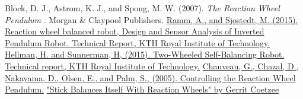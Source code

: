 \documentclass[12pt,letterpaper]{article}
\begin{document}
 
\begin{thebibliography}{99}
 Block, D. J., Astrom, K. J., and Spong, M. W. (2007).  \emph{The Reaction Wheel Pendulum} . Morgan \& Claypool Publishers.
 \href{http://www.diva-portal.se/smash/get/diva2:916271/FULLTEXT01.pdf}{Ramm, A., and Sjostedt, M. (2015). Reaction wheel balanced robot, Design and Sensor Analysis of Inverted Pendulum Robot. Technical Report, KTH Royal Institute of Technology.}
 \href{https://kth.diva-portal.org/smash/get/diva2:916184/FULLTEXT01.pdf}{Hellman, H. and Sunnerman, H, (2015).  Two-Wheeled Self-Balancing Robot. Technical report, KTH Royal Institute of Technology.}
 \href{http://geoffrey.chauveau.free.fr/pendulum/reports/final_report.pdf}{Chauveau, G., Chazal, D., Nakayama, D., Olsen, E., and Palm, S., (2005).  Controlling the Reaction Wheel Pendulum.}
 \href{https://hackaday.com/2016/08/11/stick-balances-itself-with-reaction-wheels/}{"Stick Balances Itself With Reaction Wheels" by Gerrit Coetzee}
\end{thebibliography}
\end{document}

